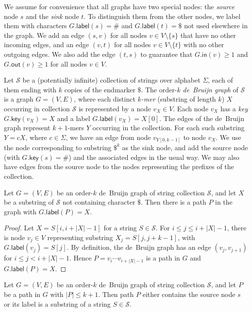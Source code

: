 \documentclass[a4paper,UKenglish]{lipics-v2016}
\newcommand{\set}[1]{\ensuremath{\{ #1 \}}}
\newcommand{\abs}[1]{\ensuremath{\lvert #1 \rvert}}
\newcommand{\gindegree}{\ensuremath{\mathsf{in}}}
\newcommand{\goutdegree}{\ensuremath{\mathsf{out}}}
\newcommand{\glabel}{\ensuremath{\mathsf{label}}}
\newcommand{\gkey}{\ensuremath{\mathsf{key}}}
\newcommand{\kmer}[1]{$#1$\nobreakdash-mer}
\newcommand{\orderk}[1]{order\nobreakdash-$#1$}
\begin{document}
We assume for convenience that all graphs have two special nodes: the \emph{source} node $s$ and the \emph{sink} node $t$. To distinguish them from the other nodes, we label them with characters $G.\glabel(s) = \#$ and $G.\glabel(t) = \$$ not used elsewhere in the graph. We add an edge $(s, v)$ for all nodes $v \in V \setminus \set{s}$ that have no other incoming edges, and an edge $(v, t)$ for all nodes $v \in V \setminus \set{t}$ with no other outgoing edges. We also add the edge $(t, s)$ to guarantee that $G.\gindegree(v) \ge 1$ and $G.\goutdegree(v) \ge 1$ for all nodes $v \in V$.

Let $\mathcal{S}$ be a (potentially infinite) collection of strings over alphabet $\Sigma$, each of them ending with $k$ copies of the endmarker $\$$. The \orderk{k} \emph{de~Bruijn graph} of $\mathcal{S}$ is a graph $G = (V, E)$, where each distinct \emph{\kmer{k}} (substring of length $k$) $X$ occurring in collection $\mathcal{S}$ is represented by a node $v_{X} \in V$. Each node $v_{X}$ has a \emph{key} $G.\gkey(v_{X}) = X$ and a label $G.\glabel(v_{X}) = X[0]$. The edges of the de~Bruijn graph represent \kmer{k+1}s $Y$ occurring in the collection. For each such substring $Y = cX$, where $c \in \Sigma$, we have an edge from node $v_{Y[0, k-1]}$ to node $v_{X}$. We use the node corresponding to substring $\$^{k}$ as the sink node, and add the source node (with $G.\gkey(s) = \#$) and the associated edges in the usual way. We may also have edges from the source node to the nodes representing the prefixes of the collection.

\begin{lemma}
Let $G = (V, E)$ be an \orderk{k} de~Bruijn graph of string collection $\mathcal{S}$, and let $X$ be a substring of $\mathcal{S}$ not containing character $\$$. Then there is a path $P$ in the graph with $G.\glabel(P) = X$.
\end{lemma}

\begin{proof}
Let $X = S[i, i+\abs{X}-1]$ for a string $S \in \mathcal{S}$. For $i \le j \le i+\abs{X}-1$, there is node $v_{j} \in V$ representing substring $X_{j} = S[j, j+k-1]$, with $G.\glabel(v_{j}) = S[j]$. By definition, the de~Bruijn graph has an edge $(v_{j}, v_{j+1})$ for $i \le j < i+\abs{X}-1$. Hence $P = v_{i} \dotsm v_{i+\abs{X}-1}$ is a path in $G$ and $G.\glabel(P) = X$.
\end{proof}

\begin{lemma}[No false positives with $\abs{P} \le k+1$]
Let $G = (V, E)$ be an \orderk{k} de~Bruijn graph of string collection $\mathcal{S}$, and let $P$ be a path in $G$ with $\abs{P} \le k+1$. Then path $P$ either contains the source node $s$ or its label is a substring of a string $S \in \mathcal{S}$.
\end{lemma}
\end{document}
